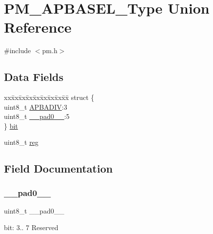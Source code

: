 \hypertarget{union_p_m___a_p_b_a_s_e_l___type}{}\section{P\+M\+\_\+\+A\+P\+B\+A\+S\+E\+L\+\_\+\+Type Union Reference}
\label{union_p_m___a_p_b_a_s_e_l___type}


{\ttfamily \#include $<$pm.\+h$>$}

\subsection*{Data Fields}
\begin{DoxyCompactItemize}
\item 
\begin{tabbing}
xx\=xx\=xx\=xx\=xx\=xx\=xx\=xx\=xx\=\kill
struct \{\\
\>uint8\_t \mbox{\hyperlink{union_p_m___a_p_b_a_s_e_l___type_ac21d02beb1f9afc9d570da32386f223f}{APBADIV}}:3\\
\>uint8\_t \mbox{\hyperlink{union_p_m___a_p_b_a_s_e_l___type_a8b4eebe79ded0459acec2f4950102ba3}{\_\_pad0\_\_}}:5\\
\} \mbox{\hyperlink{union_p_m___a_p_b_a_s_e_l___type_a6466cd6ede190bda55bac053f2238a98}{bit}}\\

\end{tabbing}\item 
uint8\+\_\+t \mbox{\hyperlink{union_p_m___a_p_b_a_s_e_l___type_a9428adc9af4653a2050e2536b55dec8d}{reg}}
\end{DoxyCompactItemize}


\subsection{Field Documentation}
\mbox{\label{union_p_m___a_p_b_a_s_e_l___type_a8b4eebe79ded0459acec2f4950102ba3}} 
\subsubsection{\texorpdfstring{\_\_pad0\_\_}{\_\_pad0\_\_}}
{\footnotesize\ttfamily uint8\+\_\+t \+\_\+\+\_\+pad0\+\_\+\+\_\+}

bit\+: 3.. 7 Reserved \mbox{\label{union_p_m___a_p_b_a_s_e_l___type_ac21d02beb1f9afc9d570da32386f223f}} 
